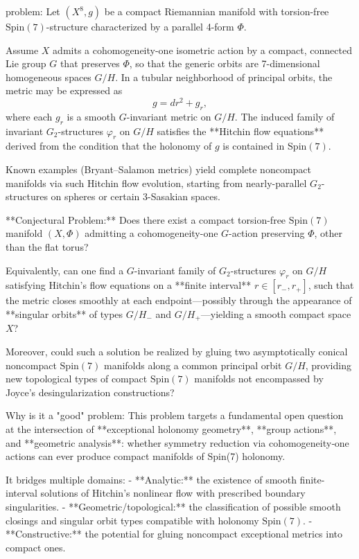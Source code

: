 problem:  
Let \( (X^8, g) \) be a compact Riemannian manifold with torsion-free \( \mathrm{Spin}(7)\)-structure characterized by a parallel 4-form \( \Phi \).  

Assume \(X\) admits a cohomogeneity-one isometric action by a compact, connected Lie group \(G\) that preserves \( \Phi \), so that the generic orbits are 7-dimensional homogeneous spaces \(G/H\).  In a tubular neighborhood of principal orbits, the metric may be expressed as  
\[
g = dr^2 + g_r,
\]
where each \(g_r\) is a smooth \(G\)-invariant metric on \(G/H\).  The induced family of invariant \(G_2\)-structures \( \varphi_r \) on \(G/H\) satisfies the **Hitchin flow equations** derived from the condition that the holonomy of \(g\) is contained in \( \mathrm{Spin}(7)\).  

Known examples (Bryant–Salamon metrics) yield complete noncompact manifolds via such Hitchin flow evolution, starting from nearly-parallel \(G_2\)-structures on spheres or certain 3-Sasakian spaces.  

**Conjectural Problem:**  
Does there exist a compact torsion-free \(\mathrm{Spin}(7)\) manifold \( (X, \Phi) \) admitting a cohomogeneity-one \(G\)-action preserving \(\Phi\), other than the flat torus?  

Equivalently, can one find a \(G\)-invariant family of \(G_2\)-structures \(\varphi_r\) on \(G/H\) satisfying Hitchin’s flow equations on a **finite interval** \(r\in [r_-, r_+]\), such that the metric closes smoothly at each endpoint—possibly through the appearance of **singular orbits** of types \(G/H_-\) and \(G/H_+\)—yielding a smooth compact space \(X\)?  

Moreover, could such a solution be realized by gluing two asymptotically conical noncompact \(\mathrm{Spin}(7)\) manifolds along a common principal orbit \(G/H\), providing new topological types of compact \(\mathrm{Spin}(7)\) manifolds not encompassed by Joyce’s desingularization constructions?

Why is it a "good" problem:  
This problem targets a fundamental open question at the intersection of **exceptional holonomy geometry**, **group actions**, and **geometric analysis**: whether symmetry reduction via cohomogeneity‑one actions can ever produce compact manifolds of Spin(7) holonomy.  

It bridges multiple domains:  
- **Analytic:** the existence of smooth finite-interval solutions of Hitchin’s nonlinear flow with prescribed boundary singularities.  
- **Geometric/topological:** the classification of possible smooth closings and singular orbit types compatible with holonomy \( \mathrm{Spin}(7)\).  
- **Constructive:** the potential for gluing noncompact exceptional metrics into compact ones.  

